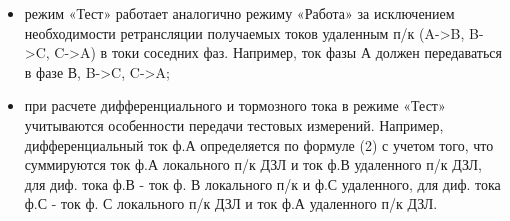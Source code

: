 \begin{enumerate}
\begin{enumerate}
  \begin{itemize}
    \item режим «Тест» работает аналогично режиму «Работа» за исключением необходимости ретрансляции получаемых токов удаленным п/к (A->B, B->C, C->A) в токи соседних фаз. Например, ток фазы А должен передаваться в фазе В, B->C, C->A;
    \item при расчете дифференциального и тормозного тока в режиме «Тест» учитываются особенности передачи тестовых измерений. Например, дифференциальный ток ф.А определяется по формуле (2) с учетом того, что суммируются ток ф.А локального п/к ДЗЛ и ток ф.В удаленного п/к ДЗЛ, для диф. тока ф.В - ток ф. В локального п/к и ф.С удаленного, для диф. тока ф.С - ток ф. С локального п/к ДЗЛ и ток ф.А удаленного п/к ДЗЛ.
  \end{itemize}
\end{enumerate}


\end{enumerate}
